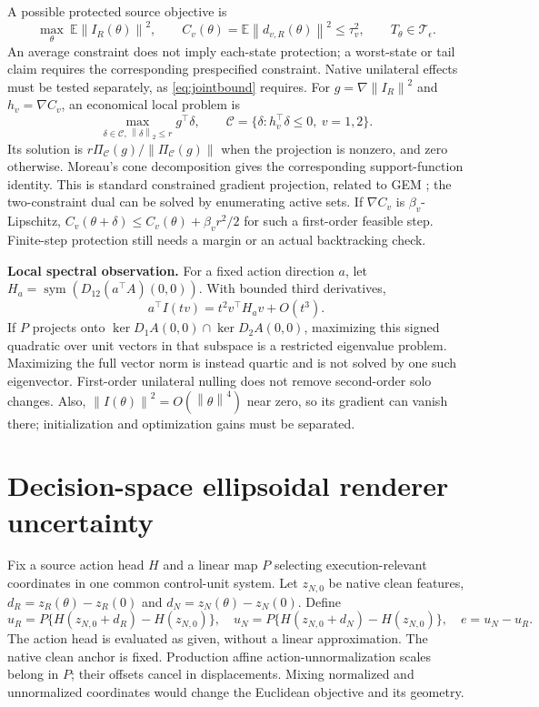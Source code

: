 \documentclass[10pt,a4paper]{article}
\newcommand{\norm}[1]{\left\|#1\right\|}
\begin{document}
A possible protected source objective is
\begin{equation}\label{eq:protected}
 \max_{\theta}\ \mathbb E\norm{I_R(\theta)}^2,
 \qquad C_v(\theta)=\mathbb E\norm{d_{v,R}(\theta)}^2\leq\tau_v^2,
 \qquad T_\theta\in\mathcal T_\epsilon.
\end{equation}
An average constraint does not imply each-state protection; a worst-state or
tail claim requires the corresponding prespecified constraint. Native
unilateral effects must be tested separately, as \eqref{eq:jointbound} requires.
For $g=\nabla\norm{I_R}^2$ and $h_v=\nabla C_v$, an economical local problem is
\begin{equation}\label{eq:cone}
 \max_{\delta\in\mathcal C,\,\norm{\delta}_2\leq r}g^\top\delta,
 \qquad\mathcal C=\{\delta:h_v^\top\delta\leq0,\ v=1,2\}.
\end{equation}
Its solution is $r\Pi_{\mathcal C}(g)/\norm{\Pi_{\mathcal C}(g)}$ when the
projection is nonzero, and zero otherwise. Moreau's cone decomposition gives
the corresponding support-function identity. This is standard constrained
gradient projection, related to GEM \cite{gem}; the two-constraint dual can be
solved by enumerating active sets. If $\nabla C_v$ is $\beta_v$-Lipschitz,
$C_v(\theta+\delta)\leq C_v(\theta)+\beta_v r^2/2$ for such a first-order
feasible step. Finite-step protection still needs a margin or an actual
backtracking check.

\textbf{Local spectral observation.}
For a fixed action direction $a$, let
$H_a=\operatorname{sym}(D_{12}(a^\top A)(0,0))$. With bounded third derivatives,
\[
 a^\top I(tv)=t^2v^\top H_av+O(t^3).
\]
If $P$ projects onto $\ker D_1A(0,0)\cap\ker D_2A(0,0)$, maximizing this
signed quadratic over unit vectors in that subspace is a restricted eigenvalue
problem. Maximizing the full vector norm is instead quartic and is not solved
by one such eigenvector. First-order unilateral nulling does not remove
second-order solo changes. Also, $\norm{I(\theta)}^2=O(\norm{\theta}^4)$ near
zero, so its gradient can vanish there; initialization and optimization gains
must be separated.

\newpage
\section{Decision-space ellipsoidal renderer uncertainty}
Fix a source action head $H$ and a linear map $P$ selecting execution-relevant
coordinates in one common control-unit system. Let $z_{N,0}$ be native clean
features, $d_R=z_R(\theta)-z_R(0)$ and $d_N=z_N(\theta)-z_N(0)$. Define
\begin{equation}\label{eq:actiondisp}
 u_R=P\{H(z_{N,0}+d_R)-H(z_{N,0})\},\quad
 u_N=P\{H(z_{N,0}+d_N)-H(z_{N,0})\},\quad e=u_N-u_R.
\end{equation}
The action head is evaluated as given, without a linear approximation. The
native clean anchor is fixed. Production affine action-unnormalization scales
belong in $P$; their offsets cancel in displacements. Mixing normalized and
unnormalized coordinates would change the Euclidean objective and its geometry.
\end{document}
